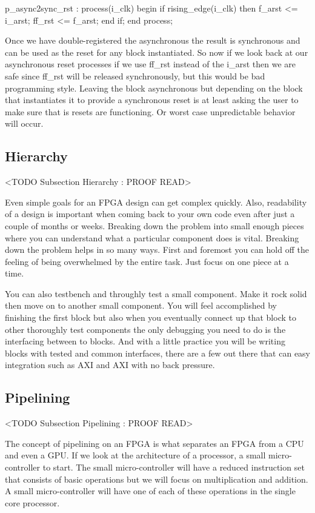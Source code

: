 \begin{VHDLlisting}[tabsize=4]
p_async2sync_rst : process(i_clk)
begin
	if rising_edge(i_clk) then
		f_arst <= i_arst;
		ff_rst <= f_arst;
	end if;
end process;
\end{VHDLlisting}
		
Once we have double-registered the asynchronous the result is synchronous and can be used as the reset for any block instantiated. So now if we look back at our asynchronous reset processes if we use ff\_rst instead of the i\_arst then we are safe since ff\_rst will be released synchronously, but this would be bad programming style. Leaving the block asynchronous but depending on the block that instantiates it to provide a synchronous reset is at least asking the user to make sure that is resets are functioning. Or worst case unpredictable behavior will occur. 
		
		
\subsection{Hierarchy} 
	<TODO Subsection Hierarchy : PROOF READ>

Even simple goals for an \ac{FPGA} design can get complex quickly. Also, readability of a design is important when coming back to your own code even after just a couple of months or weeks. Breaking down the problem into small enough pieces where you can understand what a particular component does is vital. Breaking down the problem helps in so many ways. First and foremost you can hold off the feeling of being overwhelmed by the entire task. Just focus on one piece at a time. 

You can also testbench and throughly test a small component. Make it rock solid then move on to another small component. You will feel accomplished by finishing the first block but also when you eventually connect up that block to other thoroughly test components the only debugging you need to do is the interfacing between to blocks. And with a little practice you will be writing blocks with tested and common interfaces, there are a few out there that can easy integration such as \ac{AXI} and \ac{AXI} with no back pressure. 
	
\subsection{Pipelining}
	<TODO Subsection Pipelining : PROOF READ>
	
The concept of pipelining on an \ac{FPGA} is what separates an \ac{FPGA} from a \ac{CPU} and even a \ac{GPU}. If we look at the architecture of a processor, a small micro-controller to start. The small micro-controller will have a reduced instruction set that consists of basic operations but we will focus on multiplication and addition. A small micro-controller will have one of each of these operations in the single core processor.

